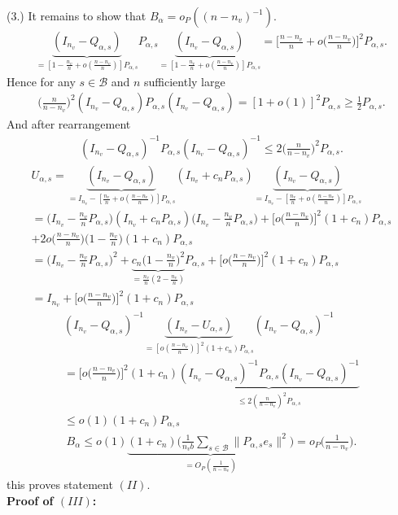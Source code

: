 \documentclass[Research_Module_ES.tex]{subfiles}
\begin{document}
(3.) It remains to show that $B_\alpha = o_P((n-n_v)^{-1})$.
\begin{align*}
\underbrace{(I_{n_v}-Q_{\alpha,s})}_{=[1-\frac{n_v}{n}+o(\frac{n-n_v}{n})]P_{\alpha,s}} P_{\alpha,s}\underbrace{(I_{n_v}-Q_{\alpha,s})}_{=[1-\frac{n_v}{n}+o(\frac{n-n_v}{n})]P_{\alpha,s}} =\biggl[\frac{n-n_v}{n}+o\biggl(\frac{n-n_v}{n}\biggr)\biggr]^2 P_{\alpha,s}.
\end{align*}
Hence for any $s\in \mathcal{B}$ and $n$ sufficiently large
\begin{align*}
\biggl(\frac{n}{n-n_v}\biggr)^2 (I_{n_v}-Q_{\alpha,s})P_{\alpha,s}(I_{n_v}-Q_{\alpha,s})=[1+o(1)]^2P_{\alpha,s}\ge \frac{1}{2}P_{\alpha,s}.
\end{align*}
And after rearrangement
\begin{align*}
(I_{n_v}-Q_{\alpha,s})^{-1}P_{\alpha,s}(I_{n_v}-Q_{\alpha,s})^{-1}\le 2 \biggl(\frac{n}{n-n_v}\biggr)^2P_{\alpha,s}.
\end{align*}
\begin{align*}
U_{\alpha,s} = \underbrace{(I_{n_v}-Q_{\alpha,s})}_{=I_{n_v}-[\frac{n_v}{n}+o(\frac{n-n_v}{n})]P_{\alpha,s}}(I_{n_v}+c_n P_{\alpha,s})\underbrace{(I_{n_v}-Q_{\alpha,s})}_{=I_{n_v}-[\frac{n_v}{n}+o(\frac{n-n_v}{n})]P_{\alpha,s}}\\
=\biggl(I_{n_v}-\frac{n_v}{n}P_{\alpha,s}\biggr)(I_{n_v}+c_n P_{\alpha,s})\biggl(I_{n_v}-\frac{n_v}{n}P_{\alpha,s}\biggr)
+\biggl[o\biggl(\frac{n-n_v}{n}\biggr)\biggr]^2(1+c_n)P_{\alpha,s} \\
+ 2o\biggl(\frac{n-n_v}{n}\biggr)\biggl(1-\frac{n_v}{n}\biggr)(1+c_n)P_{\alpha,s}\\
=\biggl(I_{n_v}-\frac{n_v}{n}P_{\alpha,s}\biggr)^2+\underbrace{c_n\biggl(1-\frac{n_v}{n}\biggr)^2}_{=\frac{n_v}{n}(2-\frac{n_v}{n})}P_{\alpha,s}+\biggl[o\biggl(\frac{n-n_v}{n}\biggr)\biggr]^2(1+c_n)P_{\alpha,s}\\
=I_{n_v} +\biggl[o\biggl(\frac{n-n_v}{n}\biggr)\biggr]^2(1+c_n)P_{\alpha,s}
\end{align*}
\begin{align*}
(I_{n_v}-Q_{\alpha,s})^{-1}\underbrace{(I_{n_v}-U_{\alpha,s})}_{=[o(\frac{n-n_v}{n})]^2(1+c_n)P_{\alpha,s}}(I_{n_v}-Q_{\alpha,s})^{-1}\\
=\biggl[o\biggl(\frac{n-n_v}{n}\biggr)\biggr]^2(1+c_n)\underbrace{(I_{n_v}-Q_{\alpha,s})^{-1}P_{\alpha,s}(I_{n_v}-Q_{\alpha,s})^{-1}}_{\le 2(\frac{n}{n-n_v})^2P_{\alpha,s}}\\
\le o(1)(1+c_n)P_{\alpha,s}
\end{align*}
\begin{align*}
B_\alpha \le o(1)\underbrace{(1+c_n)\biggl(\frac{1}{n_vb}\sum_{s\in \mathcal{B}}\lVert P_{\alpha,s}e_s\rVert^2\biggr)}_{=O_P(\frac{1}{n-n_v})}=o_P\biggl(\frac{1}{n-n_v}\biggr).
\end{align*}
this proves statement $(II)$.\\

\textbf{Proof of $(III)$:} 
\end{document}
